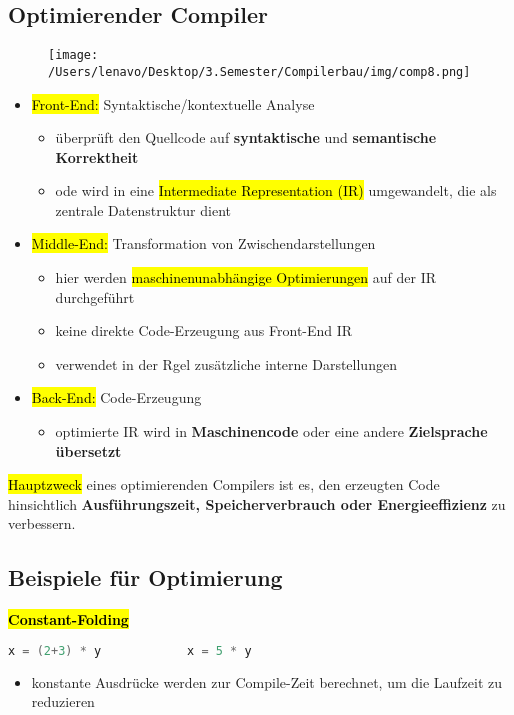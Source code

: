 \documentclass[a4paper, 10pt]{article}
\begin{document}
\subsection{Optimierender Compiler}
\begin{figure}[h]
    \centering
    \texttt{[image: /Users/lenavo/Desktop/3.Semester/Compilerbau/img/comp8.png]}
    \label{fig:enter-label}
\end{figure}
\begin{itemize}
    \item \hl{Front-End:} Syntaktische/kontextuelle Analyse
    \begin{itemize}
        \item  überprüft den Quellcode auf \textbf{syntaktische} und \textbf{semantische Korrektheit}
        \item ode wird in eine \hl{Intermediate Representation (IR)} umgewandelt, die als zentrale Datenstruktur dient
    \end{itemize}
    \item \hl{Middle-End:} Transformation von Zwischendarstellungen
    \begin{itemize}
        \item hier  werden \hl{maschinenunabhängige Optimierungen} auf der IR durchgeführt
        \item keine direkte Code-Erzeugung aus Front-End IR
        \item verwendet in der Rgel zusätzliche interne Darstellungen
    \end{itemize}
    \item \hl{Back-End:} Code-Erzeugung
    \begin{itemize}
        \item optimierte IR wird in \textbf{Maschinencode} oder eine andere \textbf{Zielsprache übersetzt}
    \end{itemize}
\end{itemize}
\hl{Hauptzweck} eines optimierenden Compilers ist es, den erzeugten Code hinsichtlich \textbf{Ausführungszeit, Speicherverbrauch oder Energieeffizienz} zu verbessern.

\subsection{Beispiele für Optimierung}
\textbf{\hl{Constant-Folding}}
\begin{lstlisting}[language = java]
    x = (2+3) * y            x = 5 * y
\end{lstlisting}    
\begin{itemize}
    \item konstante Ausdrücke werden zur Compile-Zeit berechnet, um die Laufzeit zu reduzieren
\end{itemize}
\end{document}
